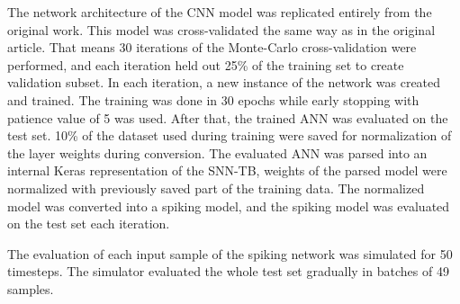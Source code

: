 The network architecture of the CNN model was replicated entirely from the original work. This model was cross-validated the same way as in the original article. That means 30 iterations of the Monte-Carlo cross-validation were performed, and each iteration held out 25\% of the training set to create validation subset. In each iteration, a new instance of the network was created and trained. The training was done in 30 epochs while early stopping with patience value of 5 was used. After that, the trained ANN was evaluated on the test set. 10\% of the dataset used during training were saved for normalization of the layer weights during conversion. The evaluated ANN was parsed into an internal Keras representation of the SNN-TB, weights of the parsed model were normalized with previously saved part of the training data. The normalized model was converted into a spiking model, and the spiking model was evaluated on the test set each iteration. \par
The evaluation of each input sample of the spiking network was simulated for 50 timesteps. The simulator evaluated the whole test set gradually in batches of 49 samples.